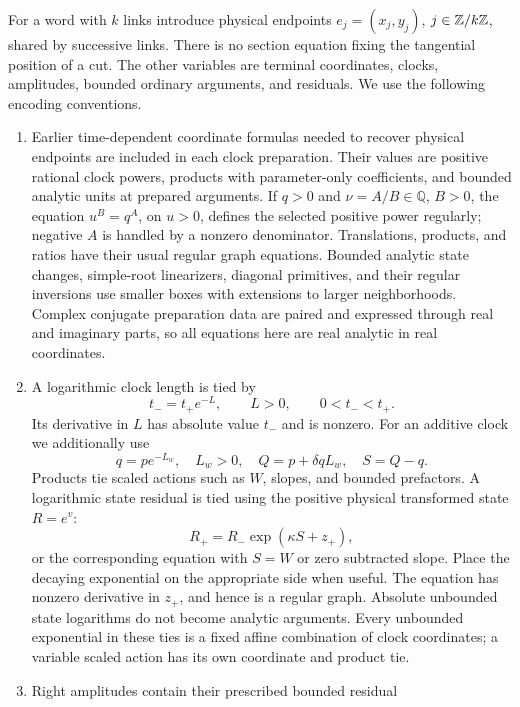 For a word with $k$ links introduce physical endpoints
$e_j=(x_j,y_j)$, $j\in\mathbb{Z}/k\mathbb{Z}$, shared by successive links.
There is no section equation fixing the tangential position of a cut.
The other variables are terminal coordinates, clocks, amplitudes,
bounded ordinary arguments, and residuals.  We use the following
encoding conventions.
\begin{enumerate}
\item Earlier time-dependent coordinate formulas needed to recover
physical endpoints are included in each clock preparation.  Their
values are positive rational clock powers, products with
parameter-only coefficients, and bounded analytic units at prepared
arguments.  If $q>0$ and $\nu=A/B\in\mathbb Q$, $B>0$, the equation
$u^B=q^A$, on $u>0$, defines the selected positive power regularly;
negative $A$ is handled by a nonzero denominator.  Translations,
products, and ratios have their usual regular graph equations.
Bounded analytic state changes, simple-root linearizers, diagonal
primitives, and their regular inversions use smaller boxes with
extensions to larger neighborhoods.  Complex conjugate preparation
data are paired and expressed through real and imaginary parts, so
all equations here are real analytic in real coordinates.
\item A logarithmic clock length is tied by
\begin{equation}\label{eq:counting-logties}
 t_-=t_+e^{-L},\qquad L>0,\qquad 0<t_-<t_+.
\end{equation}
Its derivative in $L$ has absolute value $t_-$ and is nonzero.
For an additive clock we additionally use
\[
 q=pe^{-L_w},\quad L_w>0,\quad
 Q=p+\delta qL_w,\quad S=Q-q.
\]
Products tie scaled actions such as $W$, slopes, and bounded
prefactors.  A logarithmic state residual is tied using the positive
physical transformed state $R=e^v$:
\begin{equation}\label{eq:counting-residualtie}
 R_+=R_-\exp(\kappa S+z_+),
\end{equation}
or the corresponding equation with $S=W$ or zero subtracted slope.
Place the decaying exponential on the appropriate side when useful.
The equation has nonzero derivative in $z_+$, and hence is a regular
graph.  Absolute unbounded state logarithms do not become analytic
arguments.  Every unbounded exponential in these ties is a fixed
affine combination of clock coordinates; a variable scaled action
has its own coordinate and product tie.
\item Right amplitudes contain their prescribed bounded residual

\end{enumerate}
